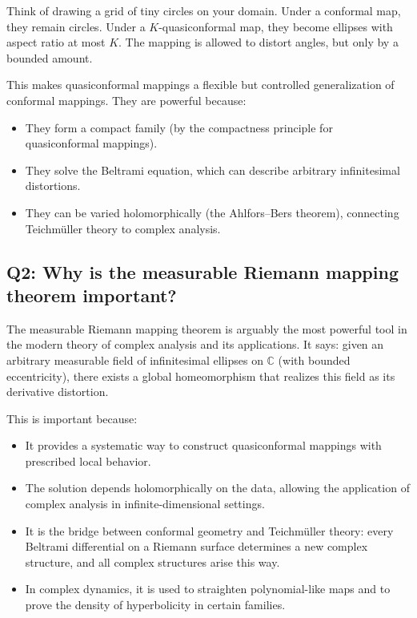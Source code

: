 Think of drawing a grid of tiny circles on your domain. Under a conformal map, they remain circles. Under a $K$-quasiconformal map, they become ellipses with aspect ratio at most $K$. The mapping is allowed to distort angles, but only by a bounded amount.

This makes quasiconformal mappings a flexible but controlled generalization of conformal mappings. They are powerful because:
\begin{itemize}
    \item They form a compact family (by the compactness principle for quasiconformal mappings).
    \item They solve the Beltrami equation, which can describe arbitrary infinitesimal distortions.
    \item They can be varied holomorphically (the Ahlfors--Bers theorem), connecting Teichm{\"u}ller theory to complex analysis.
\end{itemize}

\subsection*{Q2: Why is the measurable Riemann mapping theorem important?}

The measurable Riemann mapping theorem is arguably the most powerful tool in the modern theory of complex analysis and its applications. It says: given an arbitrary measurable field of infinitesimal ellipses on $\mathbb{C}$ (with bounded eccentricity), there exists a global homeomorphism that realizes this field as its derivative distortion.

This is important because:
\begin{itemize}
    \item It provides a systematic way to construct quasiconformal mappings with prescribed local behavior.
    \item The solution depends holomorphically on the data, allowing the application of complex analysis in infinite-dimensional settings.
    \item It is the bridge between conformal geometry and Teichm{\"u}ller theory: every Beltrami differential on a Riemann surface determines a new complex structure, and all complex structures arise this way.
    \item In complex dynamics, it is used to straighten polynomial-like maps and to prove the density of hyperbolicity in certain families.
\end{itemize}

